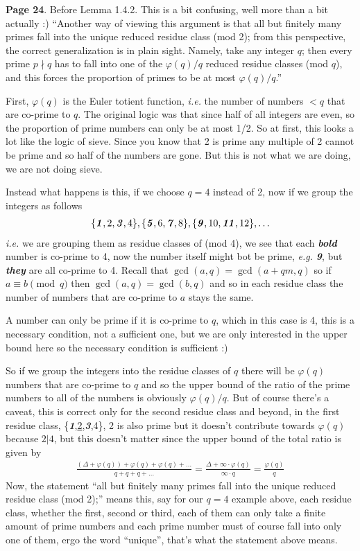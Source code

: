 \documentclass[aps,preprint,preprintnumbers,nofootinbib,showpacs,prd]{revtex4-1}
\newcommand{\ie}{{\it i.e.} }
\newcommand{\eg}{{\it e.g.} }
\newcommand{\nbea}{\begin{eqnarray*}}
\newcommand{\neea}{\end{eqnarray*}}
\begin{document}
{\bf Page 24}. Before Lemma 1.4.2. This is a bit confusing, well more than a bit actually :) ``Another way of viewing this argument is that all but finitely many primes fall into the unique reduced residue class (mod 2); from this perspective, the correct generalization is in plain sight. Namely, take any integer $q$; then every prime $p \nmid q$ has to fall into one of the $\varphi(q)/q$ reduced residue classes (mod $q$), and this forces the proportion of primes to be at most $\varphi(q)/q$.''

First, $\varphi(q)$ is the Euler totient function, \ie the number of numbers $< q$ that are co-prime to $q$. The original logic was that since half of all integers are even, so the proportion of prime numbers can only be at most 1/2. So at first, this looks a lot like the logic of sieve. Since you know that 2 is prime any multiple of 2 cannot be prime and so half of the numbers are gone. But this is not what we are doing, we are not doing sieve.

Instead what happens is this, if we choose $q=4$ instead of 2, now if we group the integers as follows
%
\nbea
\{\textbf{\textit 1},2,\textbf{\textit 3},4\},\{\textbf{\textit 5},6,\textbf{\textit {7}},8\},\{\textbf{\textit 9},10,\textbf{\textit {11}},12\}, \dots
\neea
%
\ie we are grouping them as residue classes of (mod 4), we see that each \textbf{\textit{bold}} number is co-prime to 4, now the number itself might bot be prime, \eg \textbf{\textit{9}}, but \textbf{\textit{they}} are all co-prime to 4. Recall that $\gcd(a, q) = \gcd(a + qm, q)$ so if $a \equiv b \pmod{q}$ then $\gcd(a,q) = \gcd(b,q)$ and so in each residue class the number of numbers that are co-prime to $a$ stays the same.

A number can only be prime if it is co-prime to $q$, which in this case is 4, this is a necessary condition, not a sufficient one, but we are only interested in the upper bound here so the necessary condition is sufficient :)

So if we group the integers into the residue classes of $q$ there will be $\varphi(q)$ numbers that are co-prime to $q$ and so the upper bound of the ratio of the prime numbers to all of the numbers is obviously $\varphi(q)/q$. But of course there's a caveat, this is correct only for the second residue class and beyond, in the first residue class, \{\textbf{\textit 1},\underline{2},\textbf{\textit 3},4\}, 2 is also prime but it doesn't contribute towards $\varphi(q)$ because $2|4$, but this doesn't matter since the upper bound of the total ratio is given by
%
\nbea
\frac{(\Delta + \varphi(q)) + \varphi(q) + \varphi(q) + \dots }{q + q + q + \dots} = \frac{\Delta + \infty\cdot \varphi(q)}{\infty \cdot q} = \frac{\varphi(q)}{q}
\neea
%
Now, the statement ``all but finitely many primes fall into the unique reduced residue class (mod 2);'' means this, say for our $q=4$ example above, each residue class, whether the first, second or third, each of them can only take a finite amount of prime numbers and each prime number must of course fall into only one of them, ergo the word ``unique'', that's what the statement above means.
\end{document}

